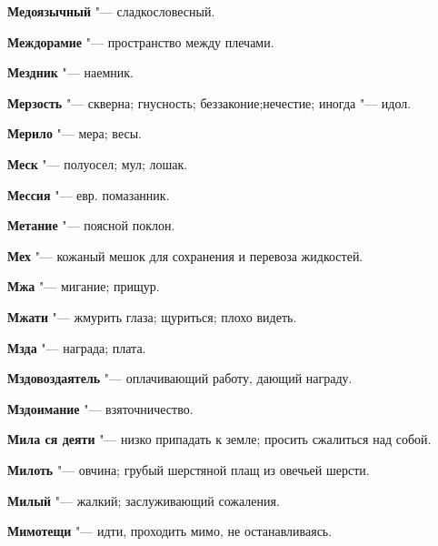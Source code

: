 \begin{mymulticols}{2}
\noindent\textbf{Медоязычный} "--- сладкословесный. 




\noindent\textbf{Междорамие} "--- пространство между плечами. 




\noindent\textbf{Мездник} "--- наемник. 




\noindent\textbf{Мерзость} "--- скверна; гнусность; беззаконие;нечестие; иногда "--- идол. 




\noindent\textbf{Мерило} "--- мера; весы. 




\noindent\textbf{Меск} "--- полуосел; мул; лошак. 




\noindent\textbf{Мессия} "--- евр. помазанник. 




\noindent\textbf{Метание} "--- поясной поклон. 




\noindent\textbf{Мех} "--- кожаный мешок для сохранения и перевоза жидкостей. 




\noindent\textbf{Мжа} "--- мигание; прищур. 




\noindent\textbf{Мжати} "--- жмурить глаза; щуриться; плохо видеть. 




\noindent\textbf{Мзда} "--- награда; плата. 




\noindent\textbf{Мздовоздаятель} "--- оплачивающий работу, дающий награду. 




\noindent\textbf{Мздоимание} "--- взяточничество. 




\noindent\textbf{Мила ся деяти} "--- низко припадать к земле; просить сжалиться над собой. 




\noindent\textbf{Милоть} "--- овчина; грубый шерстяной плащ из овечьей шерсти. 




\noindent\textbf{Милый} "--- жалкий; заслуживающий сожаления. 




\noindent\textbf{Мимотещи} "--- идти, проходить мимо, не останавливаясь. 





\end{mymulticols}

